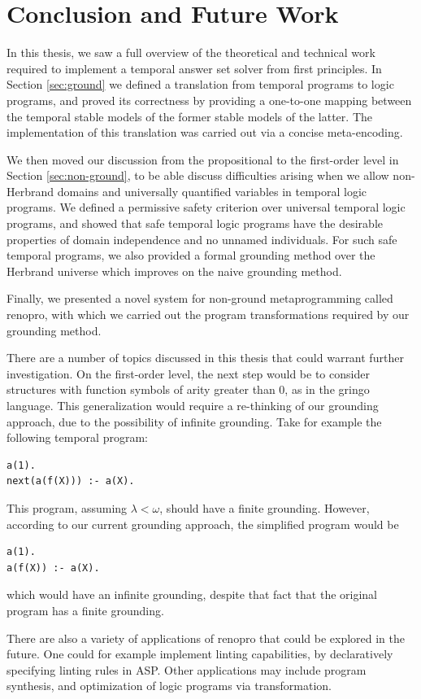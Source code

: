 \section{Conclusion and Future Work}

In this thesis, we saw a full overview of the theoretical and
technical work required to implement a temporal answer set solver from
first principles. In Section \ref{sec:ground} we defined a translation
from temporal programs to logic programs, and proved its correctness
by providing a one-to-one mapping between the temporal stable models
of the former stable models of the latter. The implementation of this
translation was carried out via a concise meta-encoding.

We then moved our discussion from the propositional to the first-order
level in Section \ref{sec:non-ground}, to be able discuss difficulties
arising when we allow non-Herbrand domains and universally quantified
variables in temporal logic programs. We defined a permissive safety
criterion over universal temporal logic programs, and showed that safe
temporal logic programs have the desirable properties of domain
independence and no unnamed individuals. For such safe temporal
programs, we also provided a formal grounding method over the Herbrand
universe which improves on the naive grounding method.

Finally, we presented a novel system for non-ground metaprogramming
called renopro, with which we carried out the program transformations
required by our grounding method.

There are a number of topics discussed in this thesis that could
warrant further investigation. On the first-order level, the next step
would be to consider structures with function symbols of arity greater
than 0, as in the gringo language. This generalization would require a
re-thinking of our grounding approach, due to the possibility of
infinite grounding. Take for example the following temporal program:

\begin{lstlisting}[language=clingo,numbers=none]
a(1).
next(a(f(X))) :- a(X).
\end{lstlisting}

This program, assuming $\lambda < \omega$, should have a finite
grounding. However, according to our current grounding approach, the
simplified program would be

\begin{lstlisting}[language=clingo,numbers=none]
a(1).
a(f(X)) :- a(X).
\end{lstlisting}

which would have an infinite grounding, despite that fact that the
original program has a finite grounding.

There are also a variety of applications of renopro that could be
explored in the future. One could for example implement linting
capabilities, by declaratively specifying linting rules in ASP. Other
applications may include program synthesis, and optimization of logic
programs via transformation.
